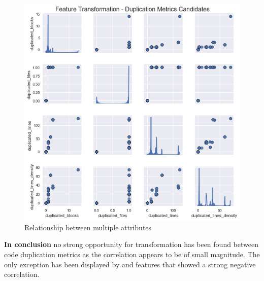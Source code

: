 \begin{figure}
    \centering
    \includegraphics[scale=0.75]{Figures/correlation/Attribute_Relationship_in_Duplication_Metrics.png}
    \caption{Relationship between multiple attributes}
    \label{fig:candidate10-distribution}
\end{figure}


\textbf{In conclusion} no strong opportunity for transformation has been found between code duplication metrics as the correlation appears to be of small magnitude. The only exception has been displayed by \duplicatedBlocks{} and \duplicatedFiles{} features that showed a strong negative correlation.
\FloatBarrier
